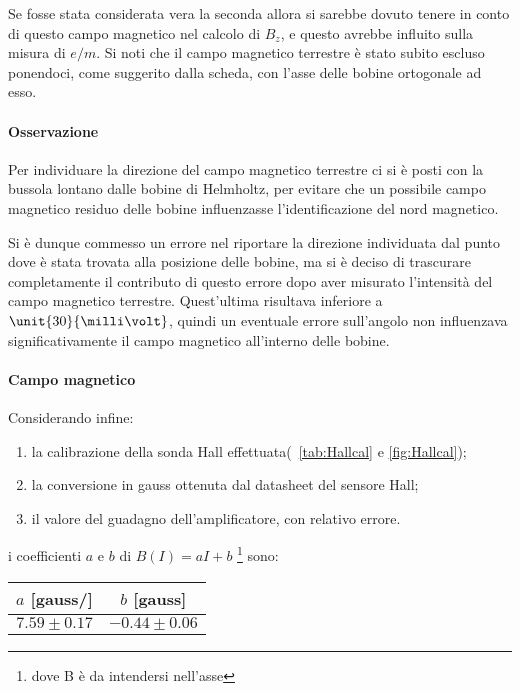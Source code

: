 \documentclass[10pt,a4paper]{article}
\begin{document}
Se fosse stata considerata vera la seconda allora si sarebbe dovuto tenere in conto di questo campo magnetico nel calcolo di $B_z$, e questo avrebbe influito sulla misura di $e/m$. Si noti che il campo magnetico terrestre è stato subito escluso ponendoci, come suggerito dalla scheda, con l'asse delle bobine ortogonale ad esso.

\paragraph{Osservazione} Per individuare la direzione del campo magnetico terrestre ci si è posti con la bussola lontano dalle bobine di Helmholtz, per evitare che un possibile campo magnetico residuo delle bobine influenzasse l'identificazione del nord magnetico. 

Si è dunque commesso un errore nel riportare la direzione individuata dal punto dove è stata trovata alla posizione delle bobine, ma si è deciso di trascurare completamente il contributo di questo errore dopo aver misurato l'intensità del campo magnetico terrestre.
Quest'ultima risultava inferiore a $\unit{30}{\milli\volt}$, quindi un eventuale errore sull'angolo non influenzava significativamente il campo magnetico all'interno delle bobine.

\paragraph{Campo magnetico} Considerando infine:
\begin{enumerate}
	\item la calibrazione della sonda Hall effettuata(\tablename{~\ref{tab:Hallcal}} e \figurename{\ref{fig:Hallcal}});
	\item la conversione in gauss ottenuta dal datasheet del sensore Hall;
	\item il valore del guadagno dell'amplificatore, con relativo errore.
\end{enumerate}
i coefficienti $a$ e $b$ di $B(I)=aI+b$ \footnote{dove B è da intendersi nell'asse} sono:

\begin{table}[H]
	\centering
	\begin{tabular}{c|c}
		$a$ [gauss/\ampere] & $b$ [gauss]\\
		\hline
		$7.59 \pm 0.17$ & $-0.44 \pm 0.06$\\
	\end{tabular}
\end{table}
\end{document}

